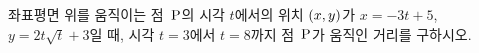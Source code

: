 좌표평면 위를 움직이는 점~$\mathrm{P}$의 시각 $t$에서의 위치 $(x{,}\mkern3mu\mathopen{}y)$가 $x=-3t+5$, $y=2t\sqrt{t}+3$일 때, 시각 $t=3$에서 $t=8$까지 점~$\mathrm{P}$가 움직인 거리를 구하시오.
